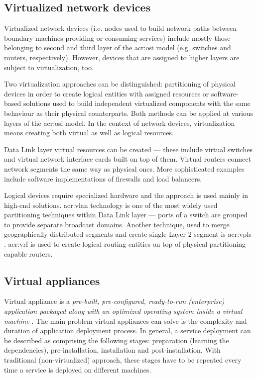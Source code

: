 \documentclass[11pt,openany]{book}
\begin{document}
      \subsection{Virtualized network devices}

        Virtualized network devices (i.e. nodes used to build network paths between boundary machines providing or
        consuming services) include mostly those belonging to second and third layer of the \gls{acr:osi} model (e.g.
        switches and routers, respectively). However, devices that are assigned to higher layers are subject to
        virtualization, too.

        Two virtualization approaches can be distinguished: partitioning of physical devices in order to create logical
        entities with assigned resources or software-based solutions used to build independent virtualized components
        with the same behaviour as their physical counterparts. Both methods can be applied at various layers of the
        \gls{acr:osi} model. In the context of network devices, virtualization means creating both virtual as well as
        logical resources.

        Data Link layer virtual resources can be created --- these include virtual switches and virtual network
        interface cards built on top of them. Virtual routers connect network segments the same way as physical ones.
        More sophisticated examples include software implementations of firewalls and load balancers.

        Logical devices require specialized hardware and the approach is used mainly in high-end solutions.
        \gls{acr:vlan} technology is one of the most widely used partitioning techniques within Data Link layer ---
        ports of a switch are grouped to provide separate broadcast domains. Another technique, used to merge
        geographically distributed segments and create single Layer 2 segment is \gls{acr:vpls} \cite{moreno}.
        \gls{acr:vrf} is used to create logical routing entities on top of physical partitioning-capable routers.


      \subsection{Virtual appliances}
      \label{sub:}

        Virtual appliance is a \textit{pre-built, pre-configured, ready-to-run (enterprise) application packaged along
        with an optimized operating system inside a virtual machine} \cite{changhua}. The main problem virtual
        appliances can solve is the complexity and duration of application deployment process.  In general, a service
        deployment can be described as comprising the following stages: preparation (learning the dependencies),
        pre-installation, installation and post-installation. With traditional (non-virtualized) approach, these stages
        have to be repeated every time a service is deployed on different machines.
\end{document}
